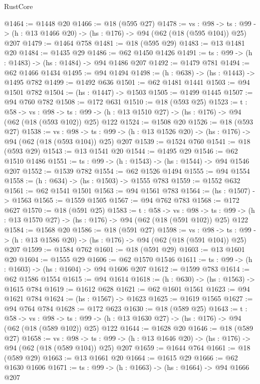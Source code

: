 \begin{lexlean}{RustCore}
\begin{coremodule}
@1464 := @1448 @20
@1466 := @18 (@595 @27)
@1478 := {vs : @98} ->
  {ts : @99} -> (h : @13 @1466 @20) -> (hs : @176) -> @94 (@62 (@18 (@595 @104)) @25) @207
@1479 := @1464 @758
@1481 := @18 (@595 @29)
@1483 := @13 @1481 @20
@1484 := @1435 @29
@1486 := @62 @1450 @1426
@1491 := {ts : @99} -> (h : @1483) -> (hs : @1484) -> @94 @1486 @207
@1492 := @1479 @781
@1494 := @62 @1466 @1434
@1495 := @94 @1494
@1498 := (h : @638) -> (hs : @1443) -> @1495 @782
@1499 := @1492 @636
@1501 := @62 @1481 @1441
@1503 := @94 @1501 @782
@1504 := (hs : @1447) -> @1503
@1505 := @1499 @1445
@1507 := @94 @760 @782
@1508 := @172 @631
@1510 := @18 (@593 @25)
@1523 := {t : @58} ->
  {vs : @98} ->
  {ts : @99} -> (h : @13 @1510 @27) -> (hs : @176) -> @94 (@62 (@18 (@593 @102)) @25) @122
@1524 := @1508 @20
@1526 := @18 (@593 @27)
@1538 := {vs : @98} ->
  {ts : @99} -> (h : @13 @1526 @20) -> (hs : @176) -> @94 (@62 (@18 (@593 @104)) @25) @207
@1539 := @1524 @760
@1541 := @18 (@593 @29)
@1543 := @13 @1541 @20
@1544 := @1495 @29
@1546 := @62 @1510 @1486
@1551 := {ts : @99} -> (h : @1543) -> (hs : @1544) -> @94 @1546 @207
@1552 := @1539 @782
@1554 := @62 @1526 @1494
@1555 := @94 @1554
@1558 := (h : @634) -> (hs : @1503) -> @1555 @783
@1559 := @1552 @632
@1561 := @62 @1541 @1501
@1563 := @94 @1561 @783
@1564 := (hs : @1507) -> @1563
@1565 := @1559 @1505
@1567 := @94 @762 @783
@1568 := @172 @627
@1570 := @18 (@591 @25)
@1583 := {t : @58} ->
  {vs : @98} ->
  {ts : @99} -> (h : @13 @1570 @27) -> (hs : @176) -> @94 (@62 (@18 (@591 @102)) @25) @122
@1584 := @1568 @20
@1586 := @18 (@591 @27)
@1598 := {vs : @98} ->
  {ts : @99} -> (h : @13 @1586 @20) -> (hs : @176) -> @94 (@62 (@18 (@591 @104)) @25) @207
@1599 := @1584 @762
@1601 := @18 (@591 @29)
@1603 := @13 @1601 @20
@1604 := @1555 @29
@1606 := @62 @1570 @1546
@1611 := {ts : @99} -> (h : @1603) -> (hs : @1604) -> @94 @1606 @207
@1612 := @1599 @783
@1614 := @62 @1586 @1554
@1615 := @94 @1614
@1618 := (h : @630) -> (hs : @1563) -> @1615 @784
@1619 := @1612 @628
@1621 := @62 @1601 @1561
@1623 := @94 @1621 @784
@1624 := (hs : @1567) -> @1623
@1625 := @1619 @1565
@1627 := @94 @764 @784
@1628 := @172 @623
@1630 := @18 (@589 @25)
@1643 := {t : @58} ->
  {vs : @98} ->
  {ts : @99} -> (h : @13 @1630 @27) -> (hs : @176) -> @94 (@62 (@18 (@589 @102)) @25) @122
@1644 := @1628 @20
@1646 := @18 (@589 @27)
@1658 := {vs : @98} ->
  {ts : @99} -> (h : @13 @1646 @20) -> (hs : @176) -> @94 (@62 (@18 (@589 @104)) @25) @207
@1659 := @1644 @764
@1661 := @18 (@589 @29)
@1663 := @13 @1661 @20
@1664 := @1615 @29
@1666 := @62 @1630 @1606
@1671 := {ts : @99} -> (h : @1663) -> (hs : @1664) -> @94 @1666 @207

\end{coremodule}
\end{lexlean}
